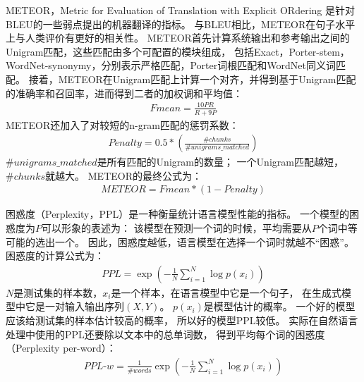 METEOR，Metric for Evaluation of Translation with Explicit ORdering
是针对BLEU的一些弱点提出的机器翻译的指标。
与BLEU相比，METEOR在句子水平上与人类评价有更好的相关性。
METEOR首先计算系统输出和参考输出之间的Unigram匹配，这些匹配由多个可配置的模块组成，
包括Exact，Porter-stem，WordNet-synonymy，分别表示严格匹配，Porter词根匹配和WordNet同义词匹配。
接着，METEOR在Unigram匹配上计算一个对齐，并得到基于Unigram匹配的准确率和召回率，进而得到二者的加权调和平均值：
\begin{align}
    \textit{Fmean} = \frac{10PR}{R + 9P}
\end{align}
METEOR还加入了对较短的n-gram匹配的惩罚系数：
\begin{align}
    \textit{Penalty} = 0.5 * \left( \frac{\#chunks}{\#unigrams\_matched} \right)
\end{align}
$\#unigrams\_matched$是所有匹配的Unigram的数量；
一个Unigram匹配越短，$\#chunks$就越大。
METEOR的最终公式为：
\begin{align}
    \textit{METEOR} = \textit{Fmean} * (1 - \textit{Penalty})
\end{align}

困惑度（Perplexity，PPL）是一种衡量统计语言模型性能的指标。
一个模型的困惑度为$P$可以形象的表述为：
该模型在预测一个词的时候，平均需要从$P$个词中等可能的选出一个。
因此，困惑度越低，语言模型在选择一个词时就越不“困惑”。
困惑度的计算公式为：
\begin{align}
    \textit{PPL} = \exp(-\frac{1}{N} \sum_{i=1}^N \log p(x_i))
\end{align}
$N$是测试集的样本数，$x_i$是一个样本，在语言模型中它是一个句子，
在生成式模型中它是一对输入输出序列$(X, Y)$。
$p(x_i)$是模型估计的概率。
一个好的模型应该给测试集的样本估计较高的概率， 所以好的模型PPL较低。
实际在自然语言处理中使用的PPL还要除以文本中的总单词数，
得到平均每个词的困惑度（Perplexity per-word）：
\begin{align}
    \textit{PPL-w} = \frac{1}{\#\textit{words}} \exp(-\frac{1}{N} \sum_{i=1}^N \log p(x_i))
\end{align}

